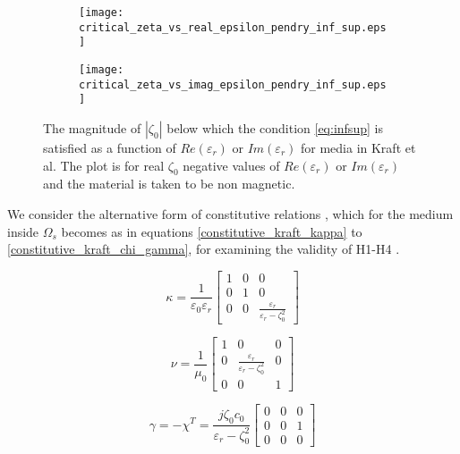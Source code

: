 \begin{figure}[H]
\centering
\begin{subfigure}[b]{0.49\textwidth}
\texttt{[image: critical\_zeta\_vs\_real\_epsilon\_pendry\_inf\_sup.eps]}
\end{subfigure}
%
\begin{subfigure}[b]{0.49\textwidth}
\centering
\texttt{[image: critical\_zeta\_vs\_imag\_epsilon\_pendry\_inf\_sup.eps]}
\end{subfigure}
\caption{The magnitude of $|\zeta_0|$ below which the condition \ref{eq:infsup} is satisfied as a function of $Re(\varepsilon_r)$ or $Im(\varepsilon_r)$ for media in Kraft et al.
The plot is for real $\zeta_0$ negative values of  $Re(\varepsilon_r)$ or $Im(\varepsilon_r)$ and the material is taken to be non magnetic.}
\label{fi:critical_zeta_vs_epsilonr_inf_sup}
\end{figure}

We consider the alternative form of constitutive relations , 
which for the medium inside $\Omega_s$ becomes as
in equations \eqref{constitutive_kraft_kappa} to \eqref{constitutive_kraft_chi_gamma}, 
for examining the validity of H1-H4 \cite{noiregolarita}.

\begin{equation} \label{constitutive_kraft_kappa}
\kappa = \frac{1}{\varepsilon_0\varepsilon_r}
\begin{bmatrix}
1 & 0 & 0 \\
0 & 1 & 0 \\
0 & 0 & \frac{\varepsilon_r}{\varepsilon_r-\zeta_0^2}
\end{bmatrix}
\end{equation}

\begin{equation} \label{constitutive_kraft_nu}
\nu = \frac{1}{\mu_0}
\begin{bmatrix}
1 & 0 & 0 \\
0 & \frac{\varepsilon_r}{\varepsilon_r - \zeta_0^2} & 0 \\
0 & 0 & 1
\end{bmatrix}
\end{equation}

\begin{equation} \label{constitutive_kraft_chi_gamma}
\gamma = -\chi^T = \frac{j\zeta_0c_0}{\varepsilon_r-\zeta_0^2}
\begin{bmatrix}
0 & 0 & 0 \\
0 & 0 & 1 \\
0 & 0 & 0
\end{bmatrix}
\end{equation}


